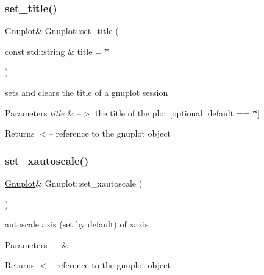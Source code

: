 \subsubsection{\texorpdfstring{set\+\_\+title()}{set\_title()}}
{\footnotesize\ttfamily \mbox{\hyperlink{class_gnuplot}{Gnuplot}}\& Gnuplot\+::set\+\_\+title (\begin{DoxyParamCaption}\item[{const std\+::string \&}]{title = {\ttfamily \char`\"{}\char`\"{}} }\end{DoxyParamCaption})\hspace{0.3cm}{\ttfamily [inline]}}



sets and clears the title of a gnuplot session 


\begin{DoxyParams}{Parameters}
{\em title} & --$>$ the title of the plot \mbox{[}optional, default == \char`\"{}\char`\"{}\mbox{]}\\
\hline
\end{DoxyParams}
\begin{DoxyReturn}{Returns}
$<$-- reference to the gnuplot object 
\end{DoxyReturn}
\mbox{\label{class_gnuplot_a11a62a04c203f01607c3c21a727e318d}} 
\subsubsection{\texorpdfstring{set\+\_\+xautoscale()}{set\_xautoscale()}}
{\footnotesize\ttfamily \mbox{\hyperlink{class_gnuplot}{Gnuplot}}\& Gnuplot\+::set\+\_\+xautoscale (\begin{DoxyParamCaption}{ }\end{DoxyParamCaption})\hspace{0.3cm}{\ttfamily [inline]}}

autoscale axis (set by default) of xaxis


\begin{DoxyParams}{Parameters}
{\em ---} & \\
\hline
\end{DoxyParams}
\begin{DoxyReturn}{Returns}
$<$-- reference to the gnuplot object 
\end{DoxyReturn}
\mbox{\label{class_gnuplot_a5b9e1a4e68f94d418a8e9194f168b448}} 
